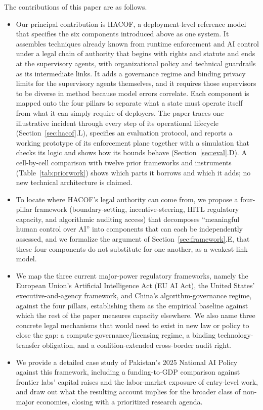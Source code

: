 \documentclass{ieeeaccess}
\newcommand{\hacof}{HACOF}
\begin{document}
The contributions of this paper are as follows.
\begin{itemize}
  \item Our principal contribution is \hacof{}, a deployment-level reference model that specifies the six components introduced above as one system. It assembles techniques already known from runtime enforcement and AI control under a legal chain of authority that begins with rights and statute and ends at the supervisory agents, with organizational policy and technical guardrails as its intermediate links. It adds a governance regime and binding privacy limits for the supervisory agents themselves, and it requires those supervisors to be diverse in method because model errors correlate. Each component is mapped onto the four pillars to separate what a state must operate itself from what it can simply require of deployers. The paper traces one illustrative incident through every step of its operational lifecycle (Section~\ref{sec:hacof}.L), specifies an evaluation protocol, and reports a working prototype of its enforcement plane together with a simulation that checks its logic and shows how its bounds behave (Section~\ref{sec:eval}.D). A cell-by-cell comparison with twelve prior frameworks and instruments (Table~\ref{tab:priorwork}) shows which parts it borrows and which it adds; no new technical architecture is claimed.
  \item To locate where \hacof{}'s legal authority can come from, we propose a four-pillar framework (boundary-setting, incentive-steering, HITL regulatory capacity, and algorithmic auditing access) that decomposes ``meaningful human control over AI'' into components that can each be independently assessed, and we formalize the argument of Section~\ref{sec:framework}.E, that these four components do not substitute for one another, as a weakest-link model.
  \item We map the three current major-power regulatory frameworks, namely the European Union's Artificial Intelligence Act (EU AI Act), the United States' executive-and-agency framework, and China's algorithm-governance regime, against the four pillars, establishing them as the empirical baseline against which the rest of the paper measures capacity elsewhere. We also name three concrete legal mechanisms that would need to exist in new law or policy to close the gap: a compute-governance/licensing regime, a binding technology-transfer obligation, and a coalition-extended cross-border audit right.
  \item We provide a detailed case study of Pakistan's 2025 National AI Policy against this framework, including a funding-to-GDP comparison against frontier labs' capital raises and the labor-market exposure of entry-level work, and draw out what the resulting account implies for the broader class of non-major economies, closing with a prioritized research agenda.
\end{itemize}
\end{document}
